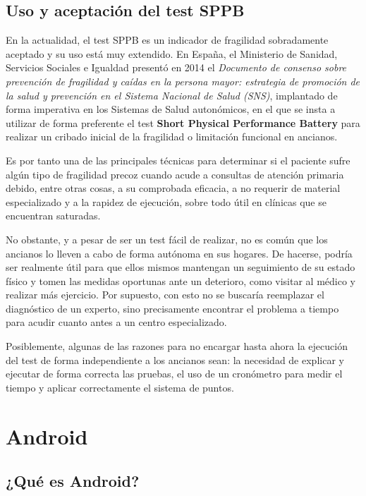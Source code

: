 \subsection{Uso y aceptación del test SPPB}

En la actualidad, el test SPPB es un indicador de fragilidad sobradamente aceptado y su uso está muy extendido. En España, el Ministerio de Sanidad, Servicios Sociales e Igualdad presentó en 2014 el \textit{Documento de consenso sobre prevención de fragilidad y caídas en la persona mayor: estrategia de promoción de la salud y prevención en el Sistema Nacional de Salud (SNS)}, implantado de forma imperativa en los Sistemas de Salud autonómicos\cite[Pag 27-28]{Fragilidad_y_nutricion}, en el que se insta a utilizar de forma preferente el test \textbf{Short Physical Performance Battery} para realizar un cribado inicial de la fragilidad o limitación funcional en ancianos\cite[Pag 21]{ministerio_sanidad}.

Es por tanto una de las principales técnicas para determinar si el paciente sufre algún tipo de fragilidad precoz cuando acude a consultas de atención primaria debido, entre otras cosas, a su comprobada eficacia, a no requerir de material especializado y a la rapidez de ejecución, sobre todo útil en clínicas que se encuentran saturadas\cite{predictive_sppb}. 

No obstante, y a pesar de ser un test fácil de realizar, no es común que los ancianos lo lleven a cabo de forma autónoma en sus hogares. De hacerse, podría ser realmente útil para que ellos mismos mantengan un seguimiento de su estado físico y tomen las medidas oportunas ante un deterioro, como visitar al médico y realizar más ejercicio. Por supuesto, con esto no se buscaría reemplazar el diagnóstico de un experto, sino precisamente encontrar el problema a tiempo para acudir cuanto antes a un centro especializado.

Posiblemente, algunas de las razones para no encargar hasta ahora la ejecución del test de forma independiente a los ancianos sean: la necesidad de explicar y ejecutar de forma correcta las pruebas, el uso de un cronómetro para medir el tiempo y aplicar correctamente el sistema de puntos.

\newpage
\section{Android}
\subsection{¿Qué es Android?}

